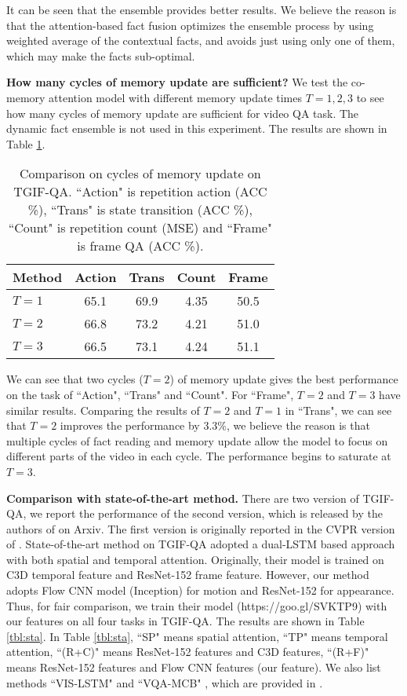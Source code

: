 \documentclass[10pt,twocolumn,letterpaper]{article}
\begin{document}
It can be seen that the ensemble provides better results. We believe the reason is that the attention-based fact fusion optimizes the ensemble process by using weighted average of the contextual facts, and avoids just using only one of them, which may make the facts sub-optimal.

\textbf{How many cycles of memory update are sufficient?} We test the co-memory attention model with different memory update times $T=1,2,3$ to see how many cycles of memory update are sufficient for video QA task. The dynamic fact ensemble is not used in this experiment. The results are shown in Table \ref{tbl:time}.

\begin{table}[h]
\centering
\caption{ Comparison on cycles of memory update on TGIF-QA. ``Action" is repetition action (ACC \%), ``Trans" is state transition (ACC \%), ``Count" is repetition count (MSE) and ``Frame" is frame QA (ACC \%).}
\vspace{5pt}
\label{tbl:time}
\begin{tabular}{l|cccc}
\hline
Method& Action & Trans & Count & Frame \\ \hline
$T=1$   &    65.1    &     69.9  &   4.35    &   50.5     \\ \hline
$T=2$   &   66.8     &    73.2   &    4.21   &     51.0  \\ \hline
$T=3$   &   66.5       &    73.1   &    4.24   &     51.1  \\ \hline
\end{tabular}
\end{table}
We can see that two cycles ($T=2$) of memory update gives the best performance on the task of ``Action", ``Trans" and ``Count". For ``Frame", $T=2$ and $T=3$ have similar results. Comparing the results of $T=2$ and $T=1$ in ``Trans", we can see that $T=2$ improves the performance by 3.3\%, we believe the reason is that multiple cycles of fact reading and memory update allow the model to focus on different parts of the video in each cycle. The performance begins to saturate at $T=3$. 

\textbf{Comparison with state-of-the-art method.} There are two version of TGIF-QA, we report the performance of the second version, which is released by the authors of \cite{Jang_2017_CVPR} on Arxiv. The first version is originally reported in the CVPR version of \cite{Jang_2017_CVPR}.
State-of-the-art method \cite{Jang_2017_CVPR} on TGIF-QA adopted a dual-LSTM based approach with both spatial and temporal attention. Originally, their model is trained on C3D \cite{Tran_2015_ICCV_c3d} temporal feature and ResNet-152 \cite{He_2016_CVPR_resnet} frame feature. However, our method adopts Flow CNN model (Inception) for motion and ResNet-152 for appearance. Thus, for fair comparison, we train their model (https://goo.gl/SVKTP9) with our features on all four tasks in TGIF-QA. The results are shown in Table \ref{tbl:sta}.   In Table \ref{tbl:sta}, ``SP" means spatial attention, ``TP" means temporal attention, ``(R+C)" means ResNet-152 features and C3D features, ``(R+F)" means ResNet-152 features and Flow CNN features (our feature). We also list methods ``VIS-LSTM" \cite{ren2015exploring} and ``VQA-MCB" \cite{fukui2016multimodal}, which are provided in \cite{Jang_2017_CVPR}.
\end{document}
